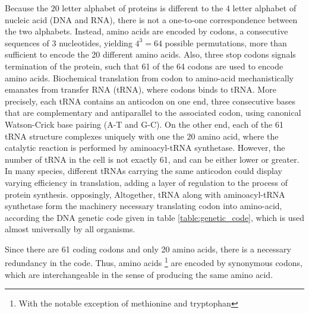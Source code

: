 Because the $20$ letter alphabet of proteins is different to the $4$ letter alphabet of nucleic acid (DNA and RNA), there is not a one-to-one correspondence between the two alphabets.
Instead, amino acids are encoded by codons, a consecutive sequences of 3 nucleotides, yielding $4^3=64$ possible permutations, more than sufficient to encode the 20 different amino acids.
Also, three stop codons signals termination of the protein, such that 61 of the 64 codons are used to encode amino acids.
Biochemical translation from \gls{codon} to amino-acid mechanistically emanates from transfer \acrshort{RNA} (\acrshort{tRNA}), where codons binds to \acrshort{tRNA}.
More precisely, each \acrshort{tRNA} contains an anticodon on one end, three consecutive bases that are complementary and antiparallel to the associated \gls{codon}, using canonical Watson-Crick base pairing (A-T and G-C).
On the other end, each of the 61 \acrshort{tRNA} structure complexes uniquely with one the $20$ amino acid, where the catalytic reaction is performed by aminoacyl-tRNA synthetase.
However, the number of tRNA in the cell is not exactly 61, and can be either lower or greater.
In many species, different tRNAs carrying the same anticodon could display varying efficiency in translation, adding a layer of regulation to the process of protein synthesis.
opposingly, 
Altogether, \acrshort{tRNA} along with aminoacyl-tRNA synthetase form the machinery necessary translating \gls{codon} into amino-acid, according the DNA genetic code given in table \ref{table:genetic_code}, which is used almost universally by all organisms.

Since there are 61 coding codons and only 20 amino acids, there is a necessary redundancy in the code.
Thus, amino acids \footnote{With the notable exception of methionine and tryptophan} are encoded by synonymous codons, which are interchangeable in the sense of producing the same amino acid. 

